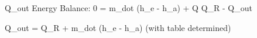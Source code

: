 Q_out  
Energy Balance:  
0 = m_dot (h_e - h_a) + Q  
Q_R - Q_out  

Q_out = Q_R + m_dot (h_e - h_a)  
(with table determined)